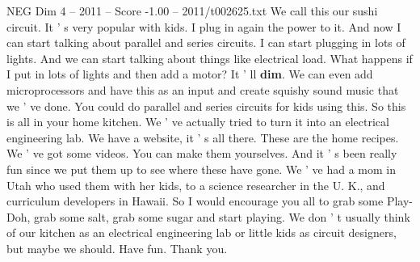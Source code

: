 \begin{textsample}{NEG Dim 4 – 2011 – Score -1.00 – 2011/t002625.txt}
We call this our sushi circuit.
It ' s very popular with kids.
I plug in again the power to it.
And now I can start talking about parallel and series circuits.
I can start plugging in lots of lights.
And we can start talking about things like electrical load.
What happens if I put in lots of lights and then add a motor?
It ' ll \textbf{dim}.
We can even add microprocessors and have this as an input and create squishy sound music that we ' ve done.
You could do parallel and series circuits for kids using this.
So this is all in your home kitchen.
We ' ve actually tried to turn it into an electrical engineering lab.
We have a website, it ' s all there.
These are the home recipes.
We ' ve got some videos.
You can make them yourselves.
And it ' s been really fun since we put them up to see where these have gone.
We ' ve had a mom in Utah who used them with her kids, to a science researcher in the U.
K., and curriculum developers in Hawaii.
So I would encourage you all to grab some Play-Doh, grab some salt, grab some sugar and start playing.
We don ' t usually think of our kitchen as an electrical engineering lab or little kids as circuit designers, but maybe we should.
Have fun.
Thank you.

\end{textsample}
